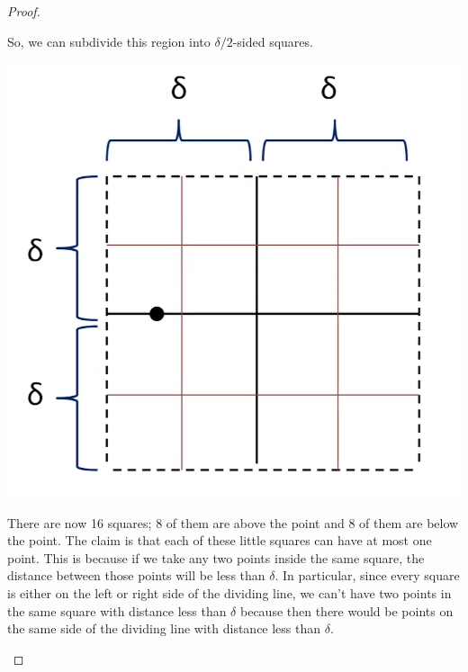 \documentclass[letterpaper]{article}
\begin{document}
\begin{mdframed}[]
\begin{proof}
\begin{center}
        \end{center}
        So, we can subdivide this region into $\delta / 2$-sided squares. 
        \begin{center}
            \includegraphics[scale=0.37]{assets/closest_proof_3.png}
        \end{center}
        There are now 16 squares; 8 of them are above the point and 8 of them are below the point. The claim is that each of these little squares can have at most one point. This is because if we take any two points inside the same square, the distance between those points will be less than $\delta$. In particular, since every square is either on the left or right side of the dividing line, we can't have two points in the same square with distance less than $\delta$ because then there would be points on the same side of the dividing line with distance less than $\delta$. 
        \begin{center}

\end{center}
\end{proof}
\end{mdframed}
\end{document}
